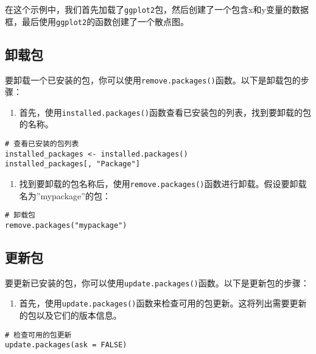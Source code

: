 \documentclass[
  letterpaper,
  DIV=11,
  numbers=noendperiod]{scrreprt}
\providecommand{\tightlist}{%
  \setlength{\itemsep}{0pt}\setlength{\parskip}{0pt}}\usepackage{longtable,booktabs,array}
\begin{document}
在这个示例中，我们首先加载了\texttt{ggplot2}包，然后创建了一个包含x和y变量的数据框，最后使用\texttt{ggplot2}的函数创建了一个散点图。

\hypertarget{ux5378ux8f7dux5305}{%
\subsection{卸载包}\label{ux5378ux8f7dux5305}}

要卸载一个已安装的包，你可以使用\texttt{remove.packages()}函数。以下是卸载包的步骤：

\begin{enumerate}
\def\labelenumi{\arabic{enumi}.}
\tightlist
\item
  首先，使用\texttt{installed.packages()}函数查看已安装包的列表，找到要卸载的包的名称。
\end{enumerate}

\begin{verbatim}
# 查看已安装的包列表
installed_packages <- installed.packages()
installed_packages[, "Package"]
\end{verbatim}

\begin{enumerate}
\def\labelenumi{\arabic{enumi}.}
\setcounter{enumi}{1}
\tightlist
\item
  找到要卸载的包名称后，使用\texttt{remove.packages()}函数进行卸载。假设要卸载名为''mypackage''的包：
\end{enumerate}

\begin{verbatim}
# 卸载包
remove.packages("mypackage")
\end{verbatim}

\hypertarget{ux66f4ux65b0ux5305}{%
\subsection{更新包}\label{ux66f4ux65b0ux5305}}

要更新已安装的包，你可以使用\texttt{update.packages()}函数。以下是更新包的步骤：

\begin{enumerate}
\def\labelenumi{\arabic{enumi}.}
\tightlist
\item
  首先，使用\texttt{update.packages()}函数来检查可用的包更新。这将列出需要更新的包以及它们的版本信息。
\end{enumerate}

\begin{verbatim}
# 检查可用的包更新
update.packages(ask = FALSE)
\end{verbatim}
\end{document}
